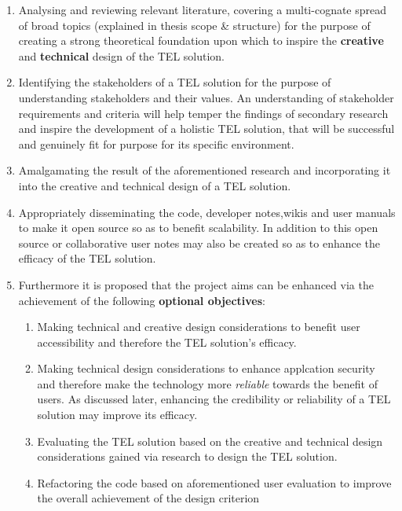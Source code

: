 \begin{enumerate}

    \item Analysing and reviewing relevant literature, covering a multi-cognate spread of broad topics (explained in thesis scope \& structure) for the purpose of creating a strong theoretical foundation upon which to inspire the \textbf{creative} and \textbf{technical} design of the TEL solution. 
    
    \item Identifying the stakeholders of a TEL solution for the purpose of understanding stakeholders and their values. An understanding of stakeholder requirements and criteria will help temper the findings of secondary research and inspire the development of a holistic TEL solution, that will be successful and genuinely fit for purpose for its specific environment.
        
    \item Amalgamating the result of the aforementioned research and incorporating it into the creative and technical design of a TEL solution.
    
    \item Appropriately disseminating the code, developer notes,wikis and user manuals to make it open source so as to benefit scalability. In addition to this open source or collaborative user notes may also be created so as to enhance the efficacy of the TEL solution.
    
    \item Furthermore it is proposed that the project aims can be enhanced via the achievement of the following \textbf{optional objectives}:
    \begin{enumerate}
    \item Making technical and creative design considerations to benefit user accessibility and therefore the TEL solution's efficacy.
    \item Making technical design considerations to enhance applcation security and therefore make the technology more \textit{reliable} towards the benefit of users. As discussed later, enhancing the credibility or reliability of a TEL solution may improve its efficacy.
    \item Evaluating the TEL solution based on the creative and technical design considerations gained via research to design the TEL solution.
    \item Refactoring the code based on aforementioned user evaluation to improve the overall achievement of the design criterion
    \end{enumerate}
\end{enumerate}



